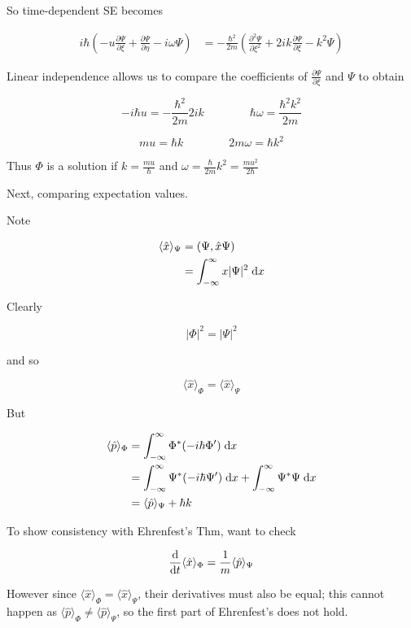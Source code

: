 \documentclass[a4paper]{article}
\begin{document}
So time-dependent SE becomes

\begin{align*}
i \hbar \left(  - u \frac{\partial \Psi }{\partial \xi} +\frac{\partial \Psi}{\partial \eta}   - i \omega \Psi \right)  & = - \frac{\hbar^{2}}{2m} \left( \frac{\partial^{2} \Psi }{\partial \xi^{2}} + 2 i k \frac{\partial \Psi }{\partial \xi}  - k^{2} \Psi  \right) 
\end{align*}

Linear independence allows us to compare the coefficients of $ \frac{\partial \Psi }{\partial \xi}  $ and $ \Psi $ to obtain

\[ - i \hbar u = - \frac{\hbar^{2}}{2m} 2 i k  \qquad \qquad  \hbar \omega =  \frac{\hbar^{2} k^{2}}{2m} \]

\[  m u = \hbar k \qquad \qquad 2m \omega = \hbar k^{2} \]

Thus $ \Phi $ is a solution if $ k = \frac{m u}{\hbar} $ and $ \omega = \frac{\hbar}{2m} k^{2} = \frac{m u^{2}}{2 \hbar} $

Next, comparing expectation values. 

Note

\begin{align*}
\langle \hat{x} \rangle_{\Psi} & =  (\Psi, \hat{x} \Psi)\\
& = \int_{-\infty}^{\infty} x | \Psi |^{2} \; \mathrm{d} x
\end{align*}

Clearly

\[ | \Phi |^{2} = | \Psi |^{2}  \]

and so

\[ \langle \hat{x} \rangle_{\Phi} = \langle \hat{x} \rangle_{\Psi} \]

But

\begin{align*}
\langle \hat{p} \rangle_{\Phi}& = \int_{-\infty}^{\infty} \Phi^{*} ( - i \hbar \Phi') \; \mathrm{d} x   \\
& = \int_{-\infty}^{\infty} \Psi^{*} ( - i \hbar \Psi') \; \mathrm{d} x  + \int_{-\infty}^{\infty} \Psi^{*} \Psi \; \mathrm{d} x  \\
& = \langle \hat{p} \rangle_{\Psi} + \hbar k
\end{align*}

To show consistency with Ehrenfest's Thm, want to check

\[ \frac{\mathrm{d} }{\mathrm{d} t} \langle \hat{x} \rangle_{\Phi}  = \frac{1}{m} \langle \hat{p}  \rangle_{\Psi}  \]

However since $ \langle \hat{x} \rangle_{\Phi} = \langle \hat{x} \rangle_{\Psi} $, their derivatives must also be equal; this cannot happen as $ \langle \hat{p} \rangle_{\Phi} \neq \langle \hat{p} \rangle_{\Psi} $, so the first part of Ehrenfest's does not hold. 
\end{document}
